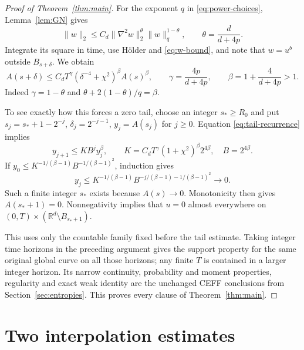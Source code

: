 \documentclass[11pt]{article}
\numberwithin{equation}{section}
\theoremstyle{definition}
\theoremstyle{remark}
\newcommand{\R}{\mathbb R}
\newcommand{\norm}[1]{\lVert #1\rVert}
\begin{document}
\begin{proof}[Proof of Theorem~\ref{thm:main}]
For the exponent $q$ in \eqref{eq:power-choices},
Lemma~\ref{lem:GN} gives
\[
 \norm w_2\le C_d\norm{\nabla^2w}_2^\theta\norm w_q^{1-\theta},
 \qquad \theta=\frac d{d+4p}.
\]
Integrate its square in time, use H\"older and \eqref{eq:w-bound}, and note
that $w=u^b$ outside $B_{s+\delta}$. We obtain
\begin{equation}\label{eq:tail-recurrence}
 A(s+\delta)\le C_d T^\gamma
      (\delta^{-4}+\chi^2)^\beta A(s)^\beta,
 \qquad
 \gamma=\frac{4p}{d+4p},\qquad
 \beta=1+\frac4{d+4p}>1.
\end{equation}
Indeed $\gamma=1-\theta$ and
$\theta+2(1-\theta)/q=\beta$.

To see exactly how this forces a zero tail, choose an integer
$s_*\ge R_0$ and put
$s_j=s_*+1-2^{-j}$, $\delta_j=2^{-j-1}$, $y_j=A(s_j)$ for $j\ge0$.
Equation \eqref{eq:tail-recurrence} implies
\[
 y_{j+1}\le KB^j y_j^\beta,\qquad
 K=C_dT^\gamma(1+\chi^2)^\beta2^{4\beta},\quad B=2^{4\beta}.
\]
If $y_0\le K^{-1/(\beta-1)}B^{-1/(\beta-1)^2}$, induction gives
\[
 y_j\le K^{-1/(\beta-1)}
          B^{-j/(\beta-1)-1/(\beta-1)^2}\longrightarrow0.
\]
Such a finite integer $s_*$ exists because $A(s)\to0$.
Monotonicity then gives $A(s_*+1)=0$.
Nonnegativity implies that $u=0$ almost everywhere on
$(0,T)\times(\R^d\setminus B_{s_*+1})$.

This uses only the countable family fixed before the tail estimate.
Taking integer time horizons in the preceding argument gives the support
property for the same original global curve on all those horizons;
any finite $T$ is contained in a larger integer horizon. Its narrow continuity, probability and moment properties,
regularity and exact weak identity are the unchanged CEFF conclusions
from Section~\ref{sec:entropies}. This proves every clause of
Theorem~\ref{thm:main}.
\end{proof}
\appendix
\section{Two interpolation estimates}\label{app:interpolation}
\end{document}
